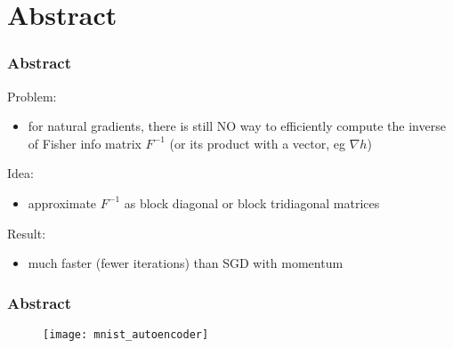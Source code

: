 \section{Abstract}

\begin{frame}
\frametitle{Abstract}

Problem:
\begin{itemize}
    \item for natural gradients, there is still NO way to efficiently compute
        the inverse of Fisher info matrix $F^{-1}$ (or its product with a vector, eg $\nabla h$)
\end{itemize}

Idea:
\begin{itemize}
    \item approximate $F^{-1}$ as block diagonal or block tridiagonal matrices
\end{itemize}

Result:
\begin{itemize}
    \item much faster (fewer iterations) than SGD with momentum
\end{itemize}

\end{frame}

\begin{frame}
\frametitle{Abstract}

\begin{figure}
    \centering
    \texttt{[image: mnist\_autoencoder]}
\end{figure}

\end{frame}
